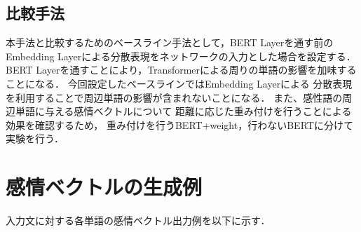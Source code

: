 	\subsection{比較手法}
		本手法と比較するためのベースライン手法として，BERT Layerを通す前の
		Embedding Layerによる分散表現をネットワークの入力とした場合を設定する．
		BERT Layerを通すことにより，Transformerによる周りの単語の影響を加味することになる．
		今回設定したベースラインではEmbedding Layerによる
		分散表現を利用することで周辺単語の影響が含まれないことになる．
		また、感性語の周辺単語に与える感情ベクトルについて
		距離に応じた重み付けを行うことによる効果を確認するため，
		重み付けを行うBERT+weight，行わないBERTに分けて実験を行う．

\section{感情ベクトルの生成例}
	入力文に対する各単語の感情ベクトル出力例を以下に示す．
